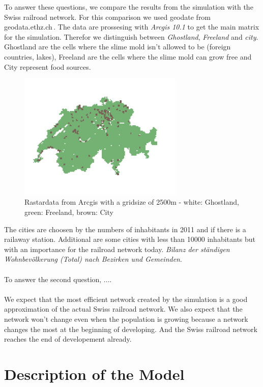 \documentclass[11pt]{article}
\begin{document}
To answer these questions, we compare the results from the simulation with the Swiss railroad network. For this comparison we used geodate from geodata.ethz.ch\,\cite{gis_data}. The data are prossesing with \textit{Arcgis 10.1} to get the main matrix for the simulation. Therefor we distinguish between \textit{Ghostland}, \textit{Freeland} and \textit{city}. Ghostland are the cells where the slime mold isn't allowed to be (foreign countries, lakes), Freeland are the cells where the slime mold can grow free and City represent food sources.

\begin{figure}[H]
	\centering
	\includegraphics[width=0.7\textwidth]{map_2500_cities.jpg}
	\caption{Rastardata from Arcgis with a gridsize of 2500m - white: Ghostland, green: Freeland, brown: City}
	\label{fig:map_cities}
\end{figure}

The cities are choosen by the numbers of inhabitants in 2011 and if there is a railaway station. Additional are some cities with less than 10000 inhabitants but with an importance for the railroad network today. \textit{Bilanz der ständigen Wohnbevölkerung (Total) nach Bezirken und Gemeinden}\cite{bfs}. ~\\
~\\
To answer the second question, ....~\\
~\\
We expect that the most efficient network created by the simulation is a good approximation of the actual Swiss railroad network. We also expect that the network won't change even when the population is growing because a network changes the most at the beginning of developing. And the Swiss railroad network reaches the end of developement already.




\section{Description of the Model}
\end{document}

